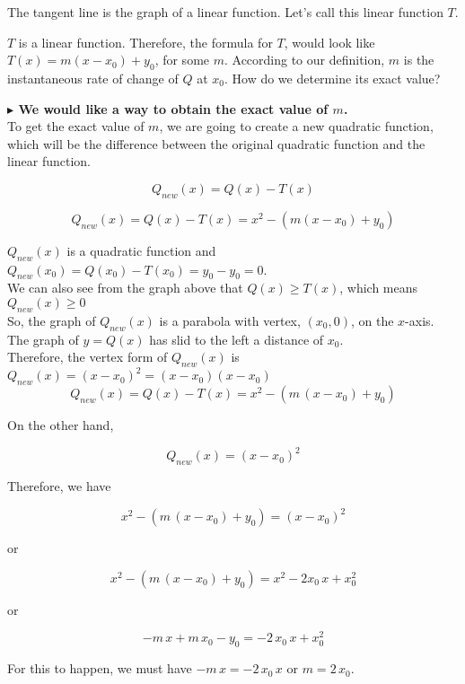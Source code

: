 \documentclass{ximera}
\begin{document}
The tangent line is the graph of a linear function. Let's call this linear function $T$.


$T$ is a linear function. Therefore, the formula for $T$, would look like $T(x) = m(x - x_0) + y_0$, for some $m$.  According to our definition, $m$ is the instantaneous rate of change of $Q$ at $x_0$.  How do we determine its exact value?



\textbf{\textcolor{blue!55!black}{$\blacktriangleright$ We would like a way to obtain the exact value of $m$.}} \\


To get the exact value of $m$, we are going to create a new quadratic function, which will be the difference between the original quadratic function and the linear function.



\begin{explanation}


\[
Q_{new}(x) = Q(x) - T(x) 
\]

\[
Q_{new}(x) = Q(x) - T(x) = x^2 - (m(x - x_0) + y_0)
\]




$Q_{new}(x)$ is a quadratic function and $Q_{new}(x_0) = Q(x_0) - T(x_0) = y_0 - y_0 = 0$. \\


We can also see from the graph above that $Q(x) \geq T(x)$, which means $Q_{new}(x) \geq 0$\\


So, the graph of $Q_{new}(x)$ is a parabola with vertex, $(x_0, 0)$, on the $x$-axis.  The graph of $y = Q(x)$ has slid to the left a distance of $x_0$.  \\


Therefore, the vertex form of $Q_{new}(x)$ is $Q_{new}(x) = (x - x_0)^2 = (x - x_0)(x - x_0)$  \\






\[
Q_{new}(x) = Q(x) - T(x) = x^2 - (m \, (x - x_0) + y_0) 
\]



On the other hand,


\[
Q_{new}(x) = (x - x_0)^2
\]



Therefore, we have

\[
x^2 - (m \, (x - x_0) + y_0) =  (x - x_0)^2
\]


or


\[
x^2 - (m \, (x - x_0) + y_0) =  x^2 - 2 x_0 \, x + x_0^2
\]


or


\[
 -m \, x + m \, x_0 - y_0 =   - 2 \, x_0 \, x + x_0^2
\]


For this to happen, we must have $-m \, x = - 2 \, x_0 \, x$ or \textbf{$m = 2 \, x_0$}. \\


\end{explanation}
\end{document}
